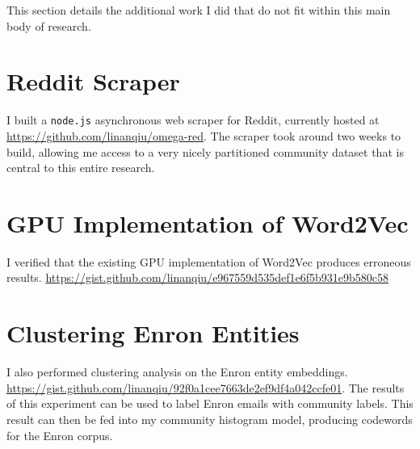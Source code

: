 This section details the additional work I did that do not fit within this main body of research.

\section{Reddit Scraper}

I built a \texttt{node.js} asynchronous web scraper for Reddit, currently hosted at \url{https://github.com/linanqiu/omega-red}. The scraper took around two weeks to build, allowing me access to a very nicely partitioned community dataset that is central to this entire research.

\section{GPU Implementation of Word2Vec}

I verified that the existing GPU implementation of Word2Vec produces erroneous results. \url{https://gist.github.com/linanqiu/e967559d535def1e6f5b931e9b580c58}

\section{Clustering Enron Entities}

I also performed clustering analysis on the Enron entity embeddings. \url{https://gist.github.com/linanqiu/92f0a1cee7663de2ef9df4a042ccfe01}. The results of this experiment can be used to label Enron emails with community labels. This result can then be fed into my community histogram model, producing codewords for the Enron corpus.